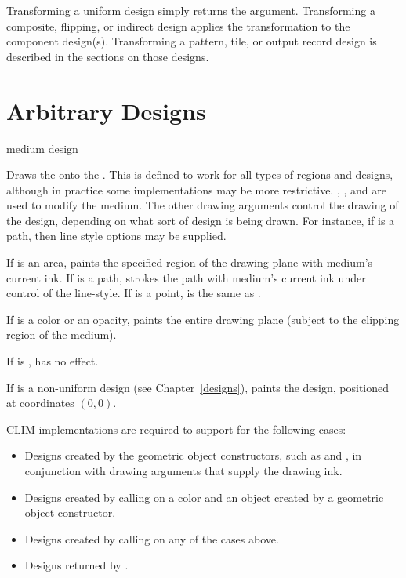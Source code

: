 Transforming a uniform design simply returns the argument.  Transforming a
composite, flipping, or indirect design applies the transformation to the
component design(s).  Transforming a pattern, tile, or output record design is
described in the sections on those designs.


\section {Arbitrary Designs}

 {medium design \key \DrawingOptions \LineJointCapOptions\ \TextOptions}

Draws the   onto the  .  This is
defined to work for all types of regions and designs, although in practice some
implementations may be more restrictive.  , , and
 are used to modify the medium.  The other drawing
arguments control the drawing of the design, depending on what sort of design is
being drawn.  For instance, if  is a path, then line style options
may be supplied.

If  is an area,  paints the specified region of the
drawing plane with medium's current ink.  If  is a
path,  strokes the path with medium's current ink under control
of the line-style.  If  is a point,  is the same as
.

If  is a color or an opacity,  paints the entire
drawing plane (subject to the clipping region of the medium).

If  is ,  has no effect.

If  is a non-uniform design (see Chapter~\ref{designs}),
 paints the design, positioned at coordinates $(0,0)$.

CLIM implementations are required to support  for the following
cases:

\begin{itemize}
\item Designs created by the geometric object constructors, such as
 and , in conjunction with drawing arguments that
supply the drawing ink.

\item Designs created by calling  on a color and an object
created by a geometric object constructor.

\item Designs created by calling  on any of the cases above.

\item Designs returned by .
\end{itemize}


